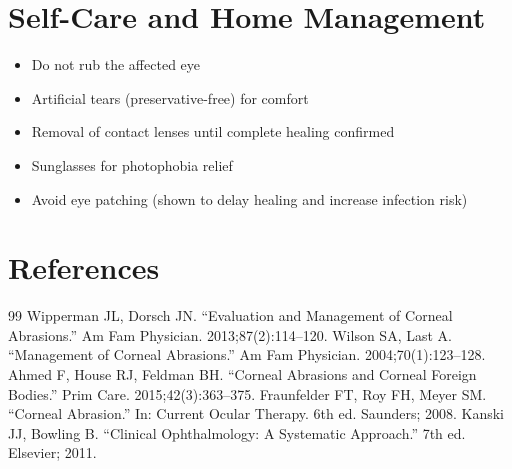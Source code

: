 \section*{Self-Care and Home Management}
\begin{itemize}
  \item Do not rub the affected eye
  \item Artificial tears (preservative-free) for comfort
  \item Removal of contact lenses until complete healing confirmed
  \item Sunglasses for photophobia relief
  \item Avoid eye patching (shown to delay healing and increase infection risk)
\end{itemize}

\section*{References}
\begin{thebibliography}{99}
 Wipperman JL, Dorsch JN. ``Evaluation and Management of Corneal Abrasions.'' Am Fam Physician. 2013;87(2):114--120.
 Wilson SA, Last A. ``Management of Corneal Abrasions.'' Am Fam Physician. 2004;70(1):123--128.
 Ahmed F, House RJ, Feldman BH. ``Corneal Abrasions and Corneal Foreign Bodies.'' Prim Care. 2015;42(3):363--375.
 Fraunfelder FT, Roy FH, Meyer SM. ``Corneal Abrasion.'' In: Current Ocular Therapy. 6th ed. Saunders; 2008.
 Kanski JJ, Bowling B. ``Clinical Ophthalmology: A Systematic Approach.'' 7th ed. Elsevier; 2011.
\end{thebibliography}
